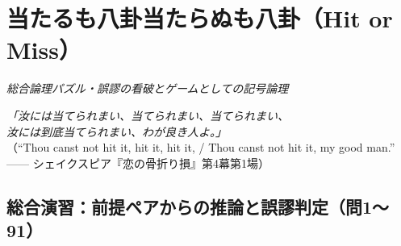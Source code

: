 \documentclass[a4paper,11pt,openany]{ltjsbook}
\begin{document}
\chapter{当たるも八卦当たらぬも八卦（Hit or Miss）}
\label{ch:iv}

\begin{center}
\large\textit{総合論理パズル・誤謬の看破とゲームとしての記号論理}
\end{center}
\vspace{4mm}

\begin{center}
\textit{「汝には当てられまい、当てられまい、当てられまい、\\
汝には到底当てられまい、わが良き人よ。」}\\
\small（``Thou canst not hit it, hit it, hit it, / Thou canst not hit it, my good man.'' —— シェイクスピア『恋の骨折り損』第4幕第1場）
\end{center}

\section*{総合演習：前提ペアからの推論と誤謬判定（問1〜91）}
\end{document}
